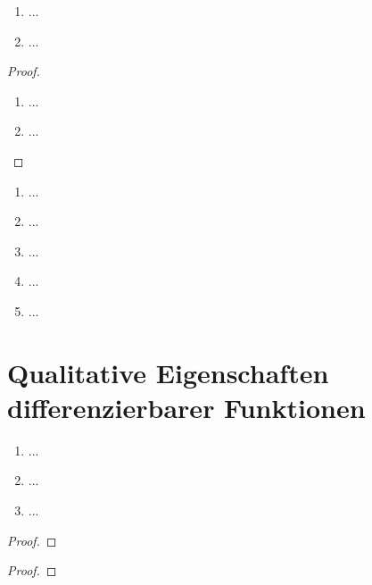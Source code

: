 \documentclass[12pt]{scrreprt}
\begin{document}
\begin{bsp}\label{}
\begin{enumerate}
\item ...
\item ...
\end{enumerate}
\end{bsp}

\begin{thm}\label{}

\end{thm}
\begin{proof}
\begin{enumerate}
\item ...
\item ...
\end{enumerate}
\end{proof}

\begin{bsp}\label{}
\begin{enumerate}
\item ...
\item ...
\item ...
\item ...
\item ...
\end{enumerate}
\end{bsp}

\begin{bsp}\label{}

\end{bsp}

\begin{dfn}\label{}

\end{dfn}
\begin{bem*}

\end{bem*}

\section{Qualitative Eigenschaften differenzierbarer Funktionen}
\label{}

\begin{dfn}\label{}

\end{dfn}

\begin{satz}\label{}
\begin{enumerate}
\item ...
\item ...
\item ...
\end{enumerate}
\end{satz}
\begin{proof}

\end{proof}
\begin{bem*}

\end{bem*}
\begin{bsp*}

\end{bsp*}
\begin{proof}

\end{proof}
\end{document}
